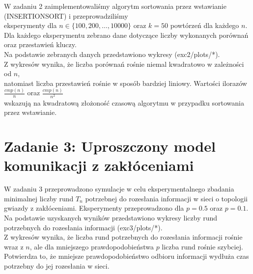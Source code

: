 \documentclass{article}
\begin{document}
W zadaniu 2 zaimplementowaliśmy algorytm sortowania przez wstawianie (INSERTIONSORT) i przeprowadziliśmy \\
eksperymenty dla \(n \in \{100, 200, \dots, 10 000\}\) oraz \(k = 50\) powtórzeń dla każdego \(n\). \\
Dla każdego eksperymentu zebrano dane dotyczące liczby wykonanych porównań oraz przestawień kluczy.\\

Na podstawie zebranych danych przedstawiono wykresy (exc2/plots/*). \\

Z wykresów wynika, że liczba porównań rośnie niemal kwadratowo w zależności od \(n\), \\
natomiast liczba przestawień rośnie w sposób bardziej liniowy. Wartości ilorazów \(\frac{cmp(n)}{n}\) oraz \(\frac{cmp(n)}{n^2}\) \\
wskazują na kwadratową złożoność czasową algorytmu w przypadku sortowania przez wstawianie.\\

\section*{Zadanie 3: Uproszczony model komunikacji z zakłóceniami}

W zadaniu 3 przeprowadzono symulacje w celu eksperymentalnego zbadania minimalnej liczby rund \(T_n\) potrzebnej do rozesłania informacji w sieci 
o topologii gwiazdy z zakłóceniami. Eksperymenty przeprowadzono dla \(p = 0.5\) oraz \(p = 0.1\).\\

Na podstawie uzyskanych wyników przedstawiono wykresy liczby rund potrzebnych do rozesłania informacji (exc3/plots/*).\\

Z wykresów wynika, że liczba rund potrzebnych do rozesłania informacji rośnie wraz z \(n\), ale dla mniejszego prawdopodobieństwa \(p\) liczba rund rośnie szybciej. \\
Potwierdza to, że mniejsze prawdopodobieństwo odbioru informacji wydłuża czas potrzebny do jej rozesłania w sieci.\\
\end{document}
